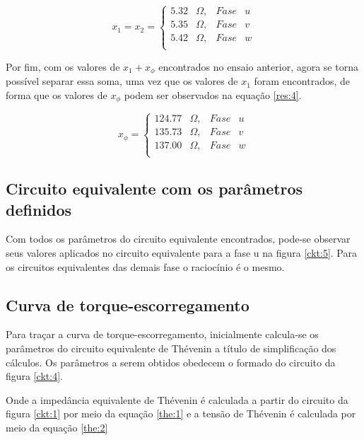 \begin{equation} \label{res:3}
x_1 = x_2 =  
\left \{
\begin{array}{clcl}
5.32&\Omega, & Fase&u \\
5.35&\Omega, & Fase&v \\
5.42&\Omega, & Fase&w \\
\end{array}
\right.
\end{equation}

Por fim, com os valores de $x_1+x_{\phi}$ encontrados no ensaio anterior, agora se torna possível separar essa soma, uma vez que os valores de $x_1$ foram encontrados, de forma que os valores de $x_{\phi}$ podem ser observados na equação \ref{res:4}.

\begin{equation} \label{res:4}
x_{\phi} =  
\left \{
\begin{array}{clcl}
124.77&\Omega, & Fase&u \\
135.73&\Omega, & Fase&v \\
137.00&\Omega, & Fase&w \\
\end{array}
\right.
\end{equation}

\subsection{Circuito equivalente com os parâmetros definidos}

Com todos os parâmetros do circuito equivalente encontrados, pode-se observar seus valores aplicados no circuito equivalente para a fase u na figura \ref{ckt:5}. Para os circuitos equivalentes das demais fase o raciocínio é o mesmo.




\subsection{Curva de torque-escorregamento}

Para traçar a curva de torque-escorregamento, inicialmente calcula-se os parâmetros do circuito equivalente de Thévenin a título de simplificação dos cálculos. Os parâmetros a serem obtidos obedecem o formado do circuito da figura \ref{ckt:4}.

Onde a impedância equivalente de Thévenin é calculada a partir do circuito da figura \ref{ckt:1} por meio da equação \ref{the:1} e a tensão de Thévenin é calculada por meio da equação \ref{the:2}

